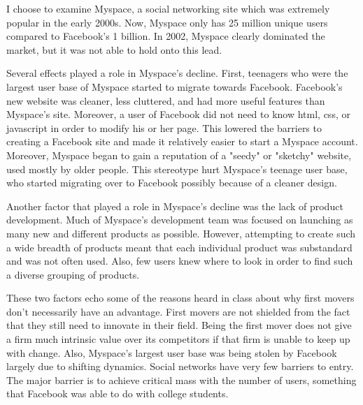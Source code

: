 \documentclass[psamsfonts]{amsart}
\newenvironment{sol}{\vspace{0.25cm}{\large \bfseries Solution:}}{\qedsymbol}
\begin{document}
\begin{sol}
I choose to examine Myspace, a social networking site which was extremely popular in the early 2000s. Now, Myspace only has 25 million unique users compared to Facebook's 1 billion. In 2002, Myspace clearly dominated the market, but it was not able to hold onto this lead.

Several effects played a role in Myspace's decline. First, teenagers who were the largest user base of Myspace started to migrate towards Facebook. Facebook's new website was cleaner, less cluttered, and had more useful features than Myspace's site. Moreover, a user of Facebook did not need to know html, css, or javascript in order to modify his or her page. This lowered the barriers to creating a Facebook site and made it relatively easier to start a Myspace account. Moreover, Myspace began to gain a reputation of a "seedy" or "sketchy" website, used mostly by older people. This stereotype hurt Myspace's teenage user base, who started migrating over to Facebook possibly because of a cleaner design.

Another factor that played a role in Myspace's decline was the lack of product development. Much of Myspace's development team was focused on launching as many new and different products as possible. However, attempting to create such a wide breadth of products meant that each individual product was substandard and was not often used. Also, few users knew where to look in order to find such a diverse grouping of products. 

These two factors echo some of the reasons heard in class about why first movers don't necessarily have an advantage. First movers are not shielded from the fact that they still need to innovate in their field. Being the first mover does not give a firm much intrinsic value over its competitors if that firm is unable to keep up with change. Also, Myspace's largest user base was being stolen by Facebook largely due to shifting dynamics. Social networks have very few barriers to entry. The major barrier is to achieve critical mass with the number of users, something that Facebook was able to do with college students. 
\end{sol}
\end{document}
